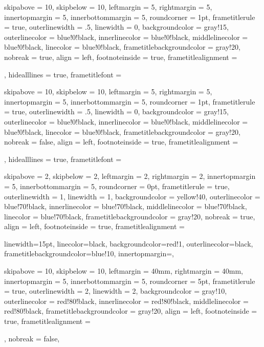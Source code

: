 {
skipabove         = 10,
skipbelow         = 10,
leftmargin        = 5,
rightmargin       = 5,
innertopmargin    = 5,
innerbottommargin = 5,
%
roundcorner =  1pt,
frametitlerule = true,
%
outerlinewidth  =  .5,
linewidth = 0,
%
backgroundcolor = gray!15,
outerlinecolor  = blue!0!black,
innerlinecolor  = blue!0!black,
middlelinecolor = blue!0!black,
linecolor       = blue!0!black,
frametitlebackgroundcolor = gray!20,
%
nobreak = true,
align = left,
footnoteinside = true,
frametitlealignment = \raggedright,
hidealllines = true,
frametitlefont = \normalfont
}


{
skipabove         = 10,
skipbelow         = 10,
leftmargin        = 5,
rightmargin       = 5,
innertopmargin    = 5,
innerbottommargin = 5,
%
roundcorner =  1pt,
frametitlerule = true,
%
outerlinewidth  =  .5,
linewidth = 0,
%
backgroundcolor = gray!15,
outerlinecolor  = blue!0!black,
innerlinecolor  = blue!0!black,
middlelinecolor = blue!0!black,
linecolor       = blue!0!black,
frametitlebackgroundcolor = gray!20,
%
nobreak = false,
align = left,
footnoteinside = true,
frametitlealignment = \raggedright,
hidealllines = true,
frametitlefont = \normalfont
}


{
skipabove         = 2,
skipbelow         = 2,
leftmargin        = 2,
rightmargin       = 2,
innertopmargin    = 5,
innerbottommargin = 5,
%
roundcorner =  0pt,
frametitlerule = true,
%
outerlinewidth  =  1,
linewidth = 1,
%
backgroundcolor = yellow!40,
outerlinecolor  = blue!70!black,
innerlinecolor  = blue!70!black,
middlelinecolor = blue!70!black,
linecolor       = blue!70!black,
frametitlebackgroundcolor = gray!20,
%
nobreak = true,
align = left,
footnoteinside = true,
frametitlealignment = \centering
}


{linewidth=15pt,
linecolor=black,
backgroundcolor=red!1,
outerlinecolor=black,
frametitlebackgroundcolor=blue!10,
innertopmargin=\topskip,}

{
skipabove         = 10,
skipbelow         = 10,
leftmargin        = 40mm,
rightmargin       = 40mm,
innertopmargin    = 5,
innerbottommargin = 5,
%
roundcorner =  5pt,
frametitlerule = true,
%
outerlinewidth  =  2,
linewidth = 2,
%
backgroundcolor = gray!10,
outerlinecolor  = red!80!black,
innerlinecolor  = red!80!black,
middlelinecolor = red!80!black,
frametitlebackgroundcolor = gray!20,
%
align = left,
footnoteinside = true,
frametitlealignment = \raggedright,
nobreak = false,
}

